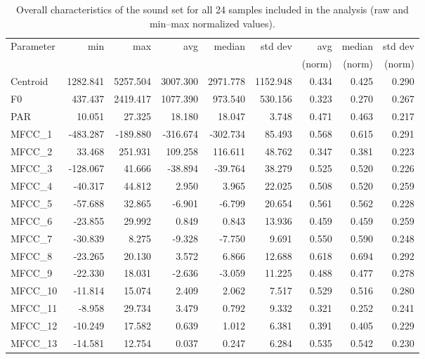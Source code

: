 \documentclass{article}
\begin{document}
\begin{table}[h]
\centering
\begin{tabular}{lrrrrrrrr}
\toprule
 Parameter & min & max & avg & median & std dev & avg & median & std dev\\
          & &  &   &  &  &(norm) &(norm) &(norm) \\
\midrule
Centroid & 1282.841 & 5257.504 & 3007.300 & 2971.778 & 1152.948 & 0.434 & 0.425 & 0.290 \\
F0 & 437.437 & 2419.417 & 1077.390 & 973.540 & 530.156 & 0.323 & 0.270 & 0.267 \\
PAR & 10.051 & 27.325 & 18.180 & 18.047 & 3.748 & 0.471 & 0.463 & 0.217 \\
MFCC\_1 & -483.287 & -189.880 & -316.674 & -302.734 & 85.493 & 0.568 & 0.615 & 0.291 \\
MFCC\_2 & 33.468 & 251.931 & 109.258 & 116.611 & 48.762 & 0.347 & 0.381 & 0.223 \\
MFCC\_3 & -128.067 & 41.666 & -38.894 & -39.764 & 38.279 & 0.525 & 0.520 & 0.226 \\
MFCC\_4 & -40.317 & 44.812 & 2.950 & 3.965 & 22.025 & 0.508 & 0.520 & 0.259 \\
MFCC\_5 & -57.688 & 32.865 & -6.901 & -6.799 & 20.654 & 0.561 & 0.562 & 0.228 \\
MFCC\_6 & -23.855 & 29.992 & 0.849 & 0.843 & 13.936 & 0.459 & 0.459 & 0.259 \\
MFCC\_7 & -30.839 & 8.275 & -9.328 & -7.750 & 9.691 & 0.550 & 0.590 & 0.248 \\
MFCC\_8 & -23.265 & 20.130 & 3.572 & 6.866 & 12.688 & 0.618 & 0.694 & 0.292 \\
MFCC\_9 & -22.330 & 18.031 & -2.636 & -3.059 & 11.225 & 0.488 & 0.477 & 0.278 \\
MFCC\_10 & -11.814 & 15.074 & 2.409 & 2.062 & 7.517 & 0.529 & 0.516 & 0.280 \\
MFCC\_11 & -8.958 & 29.734 & 3.479 & 0.792 & 9.332 & 0.321 & 0.252 & 0.241 \\
MFCC\_12 & -10.249 & 17.582 & 0.639 & 1.012 & 6.381 & 0.391 & 0.405 & 0.229 \\
MFCC\_13 & -14.581 & 12.754 & 0.037 & 0.247 & 6.284 & 0.535 & 0.542 & 0.230 \\

\bottomrule
\end{tabular}
\caption{Overall characteristics of the sound set for all 24 samples included in the analysis (raw and min--max normalized values).}
\end{table}
\end{document}
